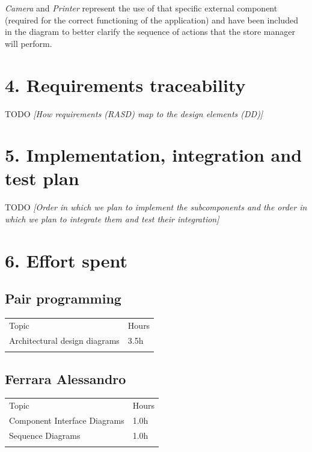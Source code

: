 \emph{Camera} and \emph{Printer} represent the use of that specific external component (required for the correct functioning of the application) and have been included in the diagram to better clarify the sequence of actions that the store manager will perform.

\chapter{4. Requirements traceability}

TODO \emph{[How requirements (RASD) map to the design elements (DD)]}

\chapter{5. Implementation, integration and test plan}

TODO \emph{[Order in which we plan to implement the subcomponents and the order in which we plan to integrate them and test their integration]}

\chapter{6. Effort spent}

\section{Pair programming}

\begin{longtable}[]{@{}
  >{\raggedright\arraybackslash}p{}
  >{\raggedleft\arraybackslash}p{}@{}}
\toprule
Topic & Hours \\ \addlinespace
\midrule
\endhead
Architectural design diagrams & 3.5h \\ \addlinespace
\bottomrule
\end{longtable}

\section{Ferrara Alessandro}

\begin{longtable}[]{@{}
  >{\raggedright\arraybackslash}p{}
  >{\raggedleft\arraybackslash}p{}@{}}
\toprule
Topic & Hours \\ \addlinespace
\midrule
\endhead
Component Interface Diagrams & 1.0h \\ \addlinespace
Sequence Diagrams & 1.0h \\ \addlinespace
\bottomrule
\end{longtable}

